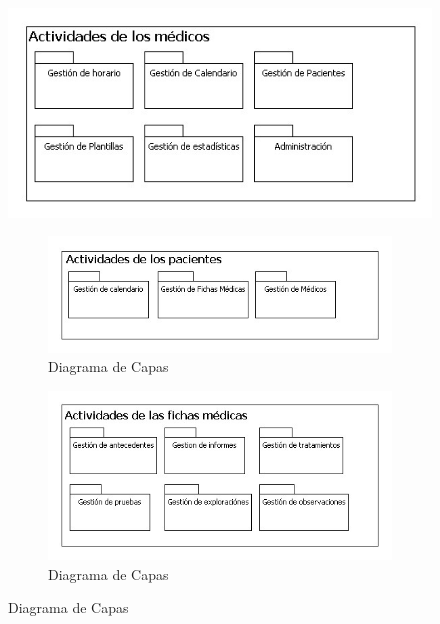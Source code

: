\documentclass[a4paper,oneside,11pt]{book}
\begin{document}
		\begin{figure}[H]
		  \centering
		    \includegraphics[width=13cm]{img/jpg/acapas/Actividades_medicos.jpg}
		  \caption{Diagrama de Capas}
		  \label{fig:acapas_medicos}
		
		\begin{figure}[H]
		  \centering
		    \includegraphics[width=13cm]{img/jpg/acapas/Actividades_Pacientes.jpg}
		  \caption{Diagrama de Capas}
		  \label{fig:acapas_pacientes}
		\end{figure}
		
		\begin{figure}[H]
		  \centering
		    \includegraphics[width=13cm]{img/jpg/acapas/fichas_medicas.jpg}
		  \caption{Diagrama de Capas}
		  \label{fig:acapas_fichas}
		\end{figure}
		\end{figure}
	

\end{document}
